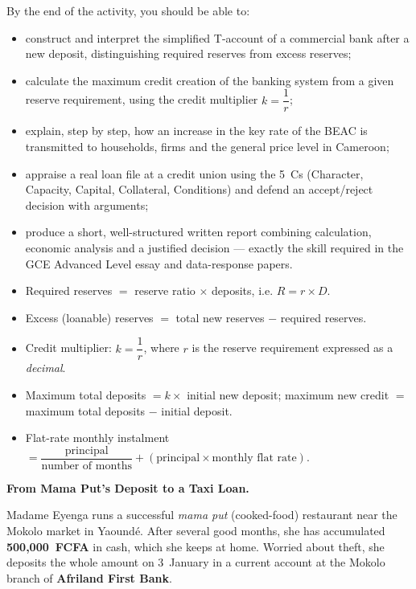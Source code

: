 \documentclass[11pt]{article}
\newcommand{\cle}[1]{{\popxbold\color{popdark}#1}}
\newcounter{popsec}
\newcounter{popsub}
\newcommand{\courssub}[1]{%
  \stepcounter{popsub}%
  \par\vspace{9pt}\noindent{\popxbold\fontsize{11.5}{13}\selectfont\color{popink}{\color{poporange}\thepopsec.\thepopsub}\hspace{6pt}#1}\par\nopagebreak\vspace{4pt}
}
\begin{document}
By the end of the activity, you should be able to:

\begin{itemize}
\item construct and interpret the simplified T-account of a commercial bank after a new deposit, distinguishing \cle{required reserves} from \cle{excess reserves};
\item calculate the maximum credit creation of the banking system from a given reserve requirement, using the credit multiplier $k = \dfrac{1}{r}$;
\item explain, step by step, how an increase in the key rate of the BEAC is transmitted to households, firms and the general price level in Cameroon;
\item appraise a real loan file at a credit union using the 5~Cs (Character, Capacity, Capital, Collateral, Conditions) and defend an accept/reject decision with arguments;
\item produce a short, well-structured written report combining calculation, economic analysis and a justified decision --- exactly the skill required in the GCE Advanced Level essay and data-response papers.
\end{itemize}

\begin{aretenir}
\begin{itemize}
\item Required reserves $=$ reserve ratio $\times$ deposits, i.e. $R = r \times D$.
\item Excess (loanable) reserves $=$ total new reserves $-$ required reserves.
\item Credit multiplier: $k = \dfrac{1}{r}$, where $r$ is the reserve requirement expressed as a \emph{decimal}.
\item Maximum total deposits $= k \times$ initial new deposit; maximum new credit $=$ maximum total deposits $-$ initial deposit.
\item Flat-rate monthly instalment $= \dfrac{\text{principal}}{\text{number of months}} + (\text{principal} \times \text{monthly flat rate})$.
\end{itemize}
\end{aretenir}

\courssub{Situation}

\textbf{From Mama Put's Deposit to a Taxi Loan.}\par

Madame Eyenga runs a successful \emph{mama put} (cooked-food) restaurant near the Mokolo market in Yaoundé. After several good months, she has accumulated \textbf{500,000~FCFA} in cash, which she keeps at home. Worried about theft, she deposits the whole amount on 3~January in a current account at the Mokolo branch of \textbf{Afriland First Bank}.
\end{document}
